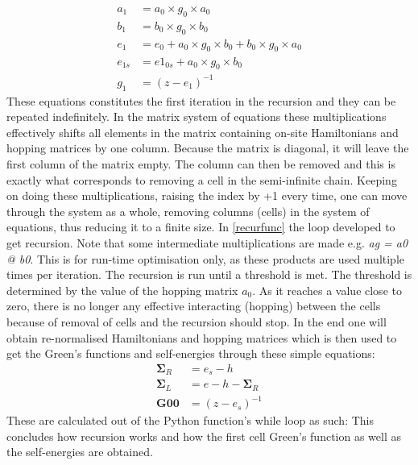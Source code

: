 \begin{align}
	a_1    & = a_0 \times g_0 \times a_0                  \nonumber                      \\
	b_1    & = b_0\times g_0\times b_0                   \nonumber                       \\
	e_1    & = e_0 + a_0\times g_0\times b_0 + b_0\times g_0\times a_0 \label{matmulrec} \\
	e_{1s} & = e1_{0s} + a_0\times g_0\times b_0          \nonumber                      \\
	g_1    & = (z - e_1)^{-1} \nonumber
\end{align}
These equations constitutes the first iteration in the recursion and they can be repeated indefinitely. In the matrix system of equations these multiplications effectively shifts all elements in the matrix containing on-site Hamiltonians and hopping matrices by one column. Because the matrix is diagonal, it will leave the first column of the matrix empty. The column can then be removed and this is exactly what corresponds to removing a cell in the semi-infinite chain. Keeping on doing these multiplications, raising the index by +1 every time, one can move through the system as a whole, removing columns (cells) in the system of equations, thus reducing it to a finite size. In \cref{recurfunc} the loop developed to get recursion.
\vspace{-.5\baselineskip}
\vspace{\baselineskip}
Note that some intermediate multiplications are made e.g. \textit{ag = a0 @ b0}. This is for run-time optimisation only, as these products are used multiple times per iteration.
The recursion is run until a threshold is met. The threshold is determined by the value of the hopping matrix \(a_0\). As it reaches a value close to zero, there is no longer any effective interacting (hopping) between the cells because of removal of cells and the recursion should stop.
In the end one will obtain re-normalised Hamiltonians and hopping matrices which is then used to get the Green's functions and self-energies through these simple equations:
\begin{align}
	\mathbf{\Sigma}_R & = e_s - h                   \nonumber       \\
	\mathbf{\Sigma}_L & = e - h - \mathbf{\Sigma}_R \label{outputs} \\
	\mathbf{G00}      & = (z - e_s)^{-1} \nonumber
\end{align}
These are calculated out of the Python function's while loop as such:
\vspace{-.5\baselineskip}
\vspace{\baselineskip}
This concludes how recursion works and how the first cell Green's function as well as the self-energies are obtained.
